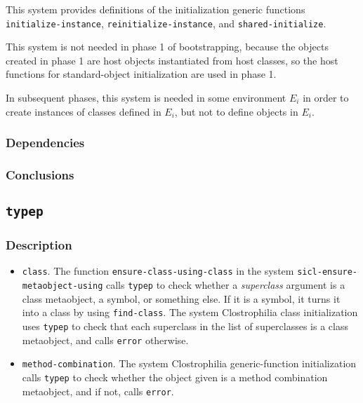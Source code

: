 This system provides definitions of the initialization generic
functions \texttt{initialize-instance},
\texttt{reinitialize-instance}, and \texttt{shared-initialize}.

This system is not needed in phase 1 of bootstrapping, because the
objects created in phase 1 are host objects instantiated from host
classes, so the host functions for standard-object initialization are
used in phase 1.

In subsequent phases, this system is needed in some environment $E_i$
in order to create instances of classes defined in $E_i$, but not to
define objects in $E_i$.

\subsubsection{Dependencies}

\subsubsection{Conclusions}

\subsection{\texttt{typep}}

\subsubsection{Description}

\begin{itemize}
\item \texttt{class}.  The function \texttt{ensure-class-using-class}
  in the system \texttt{sicl-ensure-metaobject-using} calls
  \texttt{typep} to check whether a \emph{superclass} argument is a
  class metaobject, a symbol, or something else.  If it is a symbol,
  it turns it into a class by using \texttt{find-class}.  The system
  Clostrophilia class initialization uses \texttt{typep} to check that
  each superclass in the list of superclasses is a class metaobject,
  and calls \texttt{error} otherwise.
\item \texttt{method-combination}.  The system Clostrophilia
  generic-function initialization calls \texttt{typep} to check
  whether the object given is a method combination metaobject, and if
  not, calls \texttt{error}.
\end{itemize}



